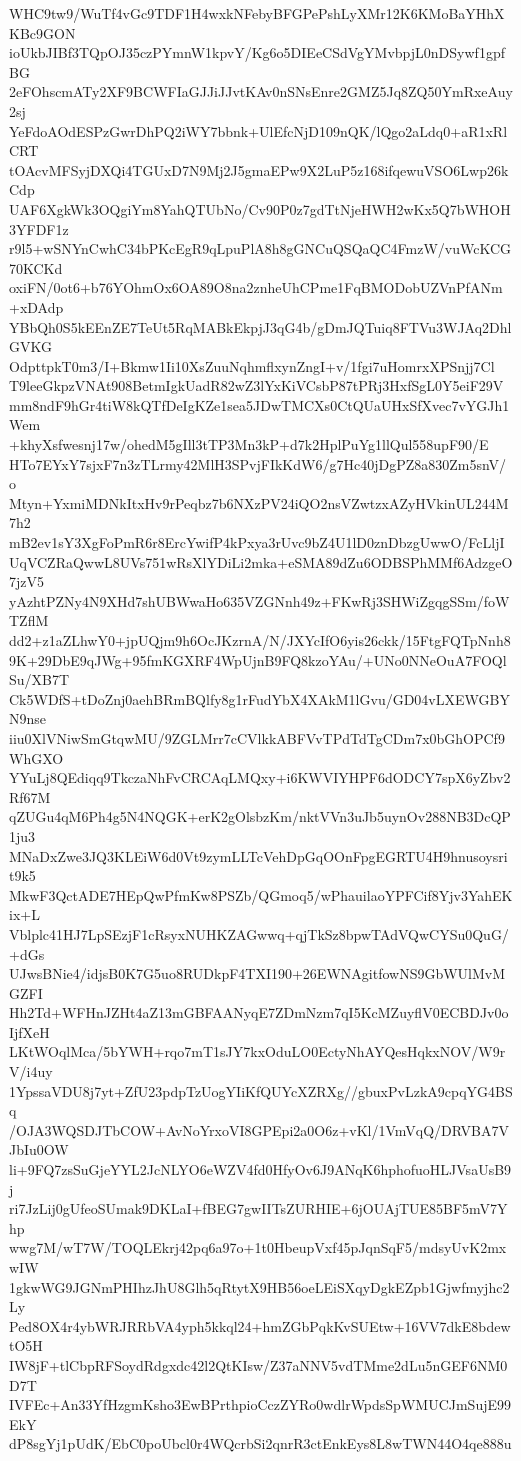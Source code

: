 WHC9tw9/WuTf4vGc9TDF1H4wxkNFebyBFGPePshLyXMr12K6KMoBaYHhXKBc9GON
ioUkbJIBf3TQpOJ35czPYmnW1kpvY/Kg6o5DIEeCSdVgYMvbpjL0nDSywf1gpfBG
2eFOhscmATy2XF9BCWFIaGJJiJJvtKAv0nSNsEnre2GMZ5Jq8ZQ50YmRxeAuy2sj
YeFdoAOdESPzGwrDhPQ2iWY7bbnk+UlEfcNjD109nQK/lQgo2aLdq0+aR1xRlCRT
tOAcvMFSyjDXQi4TGUxD7N9Mj2J5gmaEPw9X2LuP5z168ifqewuVSO6Lwp26kCdp
UAF6XgkWk3OQgiYm8YahQTUbNo/Cv90P0z7gdTtNjeHWH2wKx5Q7bWHOH3YFDF1z
r9l5+wSNYnCwhC34bPKcEgR9qLpuPlA8h8gGNCuQSQaQC4FmzW/vuWcKCG70KCKd
oxiFN/0ot6+b76YOhmOx6OA89O8na2znheUhCPme1FqBMODobUZVnPfANm+xDAdp
YBbQh0S5kEEnZE7TeUt5RqMABkEkpjJ3qG4b/gDmJQTuiq8FTVu3WJAq2DhlGVKG
OdpttpkT0m3/I+Bkmw1Ii10XsZuuNqhmflxynZngI+v/1fgi7uHomrxXPSnjj7Cl
T9leeGkpzVNAt908BetmIgkUadR82wZ3lYxKiVCsbP87tPRj3HxfSgL0Y5eiF29V
mm8ndF9hGr4tiW8kQTfDeIgKZe1sea5JDwTMCXs0CtQUaUHxSfXvec7vYGJh1Wem
+khyXsfwesnj17w/ohedM5gIll3tTP3Mn3kP+d7k2HplPuYg1llQul558upF90/E
HTo7EYxY7sjxF7n3zTLrmy42MlH3SPvjFIkKdW6/g7Hc40jDgPZ8a830Zm5snV/o
Mtyn+YxmiMDNkItxHv9rPeqbz7b6NXzPV24iQO2nsVZwtzxAZyHVkinUL244M7h2
mB2ev1sY3XgFoPmR6r8ErcYwifP4kPxya3rUvc9bZ4U1lD0znDbzgUwwO/FcLljI
UqVCZRaQwwL8UVs751wRsXlYDiLi2mka+eSMA89dZu6ODBSPhMMf6AdzgeO7jzV5
yAzhtPZNy4N9XHd7shUBWwaHo635VZGNnh49z+FKwRj3SHWiZgqgSSm/foWTZflM
dd2+z1aZLhwY0+jpUQjm9h6OcJKzrnA/N/JXYcIfO6yis26ckk/15FtgFQTpNnh8
9K+29DbE9qJWg+95fmKGXRF4WpUjnB9FQ8kzoYAu/+UNo0NNeOuA7FOQlSu/XB7T
Ck5WDfS+tDoZnj0aehBRmBQlfy8g1rFudYbX4XAkM1lGvu/GD04vLXEWGBYN9nse
iiu0XlVNiwSmGtqwMU/9ZGLMrr7cCVlkkABFVvTPdTdTgCDm7x0bGhOPCf9WhGXO
YYuLj8QEdiqq9TkczaNhFvCRCAqLMQxy+i6KWVIYHPF6dODCY7spX6yZbv2Rf67M
qZUGu4qM6Ph4g5N4NQGK+erK2gOlsbzKm/nktVVn3uJb5uynOv288NB3DcQP1ju3
MNaDxZwe3JQ3KLEiW6d0Vt9zymLLTcVehDpGqOOnFpgEGRTU4H9hnusoysrit9k5
MkwF3QctADE7HEpQwPfmKw8PSZb/QGmoq5/wPhauilaoYPFCif8Yjv3YahEKix+L
Vblplc41HJ7LpSEzjF1cRsyxNUHKZAGwwq+qjTkSz8bpwTAdVQwCYSu0QuG/+dGs
UJwsBNie4/idjsB0K7G5uo8RUDkpF4TXI190+26EWNAgitfowNS9GbWUlMvMGZFI
Hh2Td+WFHnJZHt4aZ13mGBFAANyqE7ZDmNzm7qI5KcMZuyflV0ECBDJv0oIjfXeH
LKtWOqlMca/5bYWH+rqo7mT1sJY7kxOduLO0EctyNhAYQesHqkxNOV/W9rV/i4uy
1YpssaVDU8j7yt+ZfU23pdpTzUogYIiKfQUYcXZRXg//gbuxPvLzkA9cpqYG4BSq
/OJA3WQSDJTbCOW+AvNoYrxoVI8GPEpi2a0O6z+vKl/1VmVqQ/DRVBA7VJbIu0OW
li+9FQ7zsSuGjeYYL2JcNLYO6eWZV4fd0HfyOv6J9ANqK6hphofuoHLJVsaUsB9j
ri7JzLij0gUfeoSUmak9DKLaI+fBEG7gwIITsZURHIE+6jOUAjTUE85BF5mV7Yhp
wwg7M/wT7W/TOQLEkrj42pq6a97o+1t0HbeupVxf45pJqnSqF5/mdsyUvK2mxwIW
1gkwWG9JGNmPHIhzJhU8Glh5qRtytX9HB56oeLEiSXqyDgkEZpb1Gjwfmyjhc2Ly
Ped8OX4r4ybWRJRRbVA4yph5kkql24+hmZGbPqkKvSUEtw+16VV7dkE8bdewtO5H
IW8jF+tlCbpRFSoydRdgxdc42l2QtKIsw/Z37aNNV5vdTMme2dLu5nGEF6NM0D7T
IVFEc+An33YfHzgmKsho3EwBPrthpioCczZYRo0wdlrWpdsSpWMUCJmSujE99EkY
dP8sgYj1pUdK/EbC0poUbcl0r4WQcrbSi2qnrR3ctEnkEys8L8wTWN44O4qe888u

